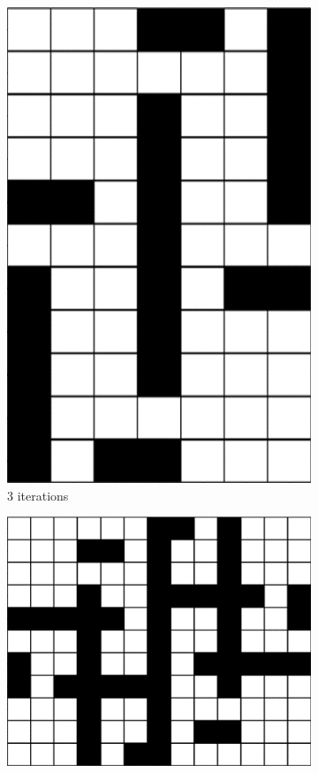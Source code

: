 \begin{figure}[H]
\begin{subfigure}[t]{0.3\textwidth}
		\includegraphics[width=\textwidth]{si_ls_3.png}
		\caption{3 iterations}
	\end{subfigure}
	\hfill
	\begin{subfigure}[t]{0.3\textwidth}
		\centering
		\includegraphics[width=\textwidth]{si_ls_4.png}

\end{subfigure}
\end{figure}
